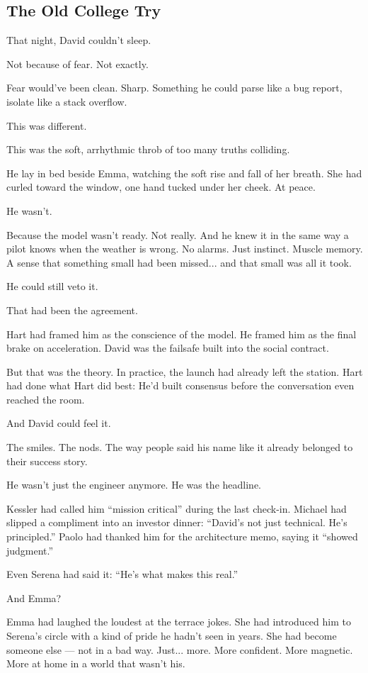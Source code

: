 \subsection{The Old College Try}

That night, David couldn’t sleep.

Not because of fear. Not exactly.

Fear would’ve been clean. Sharp. Something he could parse like a bug report, isolate like a stack overflow.

This was different.

This was the soft, arrhythmic throb of too many truths colliding.

He lay in bed beside Emma, watching the soft rise and fall of her breath. She had curled toward the window, 
one hand tucked under her cheek. At peace.

He wasn’t.

Because the model wasn’t ready. Not really. And he knew it in the same way a pilot knows when the 
weather is wrong.  
No alarms. Just instinct. Muscle memory. A sense that something small had been missed... and that 
small was all it took.

He could still veto it.

That had been the agreement.

Hart had framed him as the conscience of the model. He framed him as the final brake on acceleration.  
David was the failsafe built into the social contract.

But that was the theory.  
In practice, the launch had already left the station. Hart had done what Hart did best:  
He’d built consensus before the conversation even reached the room.

And David could feel it.

The smiles. The nods. The way people said his name like it already belonged to their success story.

He wasn’t just the engineer anymore. He was the headline.

Kessler had called him ``mission critical'' during the last check-in.  
Michael had slipped a compliment into an investor dinner: ``David’s not just technical. He’s principled.''  
Paolo had thanked him for the architecture memo, saying it ``showed judgment.''

Even Serena had said it: ``He’s what makes this real.''

And Emma?

Emma had laughed the loudest at the terrace jokes. She had introduced him to Serena’s circle with a 
kind of pride he hadn’t seen in years.  
She had become someone else — not in a bad way. Just... more. More confident. More magnetic. More at 
home in a world that wasn’t his.

